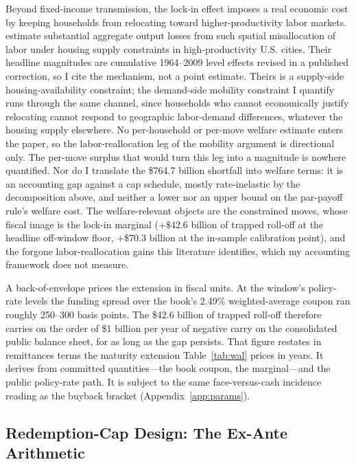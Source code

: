 \documentclass[12pt]{article}
\begin{document}
Beyond fixed-income transmission, the lock-in effect imposes a real economic cost by keeping households from relocating toward higher-productivity labor markets. \citet{hsieh2019} estimate substantial aggregate output losses from such spatial misallocation of labor under housing supply constraints in high-productivity U.S. cities. Their headline magnitudes are cumulative 1964--2009 level effects revised in a published correction, so I cite the mechanism, not a point estimate. Theirs is a supply-side housing-availability constraint; the demand-side mobility constraint I quantify runs through the same channel, since households who cannot economically justify relocating cannot respond to geographic labor-demand differences, whatever the housing supply elsewhere. No per-household or per-move welfare estimate enters the paper, so the labor-reallocation leg of the mobility argument is directional only. The per-move surplus that would turn this leg into a magnitude is nowhere quantified. Nor do I translate the \$764.7 billion shortfall into welfare terms: it is an accounting gap against a cap schedule, mostly rate-inelastic by the decomposition above, and neither a lower nor an upper bound on the par-payoff rule's welfare cost. The welfare-relevant objects are the constrained moves, whose fiscal image is the lock-in marginal ($+\$42.6$ billion of trapped roll-off at the headline off-window floor, $+\$70.3$ billion at the in-sample calibration point), and the forgone labor-reallocation gains this literature identifies, which my accounting framework does not measure.

A back-of-envelope prices the extension in fiscal units. At the window's policy-rate levels the funding spread over the book's 2.49\% weighted-average coupon ran roughly 250--300 basis points. The \$42.6 billion of trapped roll-off therefore carries on the order of \$1 billion per year of negative carry on the consolidated public balance sheet, for as long as the gap persists. That figure restates in remittances terms the maturity extension Table~\ref{tab:wal} prices in years. It derives from committed quantities---the book coupon, the marginal---and the public policy-rate path. It is subject to the same face-versus-cash incidence reading as the buyback bracket (Appendix~\ref{app:params}).

\subsection{Redemption-Cap Design: The Ex-Ante Arithmetic}\label{sec:discussion-capdesign}
\end{document}

